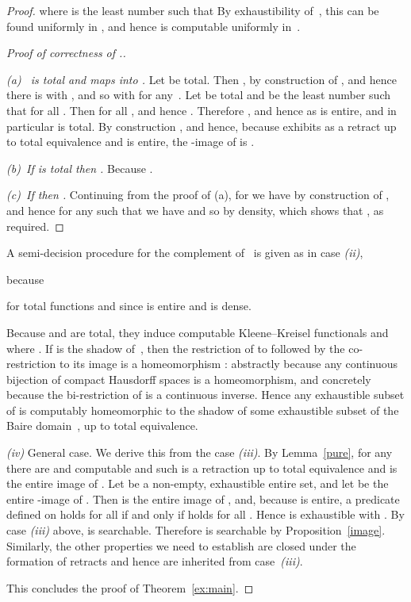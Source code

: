\documentclass{LMCS}
\begin{document}
\begin{proof}
where
 is the least number such that 
By exhaustibility of~, this can be found uniformly
  in , and hence  is computable uniformly in~.

\pagebreak[3]
\begin{proof}[Proof of correctness of .]
~

\emph{(a)~ is total and maps  into .} 
Let  be total.  Then , by
construction of , and hence there is  with , and so with  for any~. Let 
be total and  be the least number such that  for all
. Then  for all , and hence .  Therefore , and hence  as  is entire, and in
particular  is total.  By construction , and
hence, because  exhibits  as a retract up to total equivalence
and  is entire, the -image of  is .

\medskip
\emph{(b)~If  is total then .} 
Because .

\medskip
\emph{(c)~If  then .} 
Continuing from the proof of (a), for  we have  by construction of , and hence for any  such
that  we have  and so  by density, which shows
that , as required.
\end{proof}

\medskip

A semi-decision procedure for the complement of~ is
given as in case \emph{(ii)},

because 

for total functions  and  since  is entire and  is dense.

Because  and  are total, they induce computable Kleene--Kreisel
functionals  and  where . If  is the shadow of~, then the restriction of  to 
followed by the co-restriction to its image is a homeomorphism : abstractly because any continuous bijection of compact
Hausdorff spaces is a homeomorphism, and concretely because the
bi-restriction of  is a continuous inverse.  Hence any
exhaustible subset of  is computably homeomorphic to the
shadow of some exhaustible subset of the Baire domain~,
up to total equivalence.

\medskip

\pagebreak[3] \emph{(iv)} General case. We derive this from the case
\emph{(iii)}. By Lemma~\ref{pure}, for any  there are
 and computable  and  such  is a retraction up to total
equivalence and  is the entire image of .  Let  be a non-empty, exhaustible entire set, and let  be
the entire -image of . Then  is the entire image of ,
and, because  is entire, a predicate 
defined on  holds for all  if and only if 
holds for all .  Hence  is exhaustible with
. By case \emph{(iii)} above,
 is searchable. Therefore  is searchable by
Proposition~\ref{image}. Similarly, the other properties we need to
establish are closed under the formation of retracts and hence are
inherited from case~\emph{(iii)}.  

\medskip This concludes the proof of Theorem~\ref{ex:main}.
\end{proof}
\end{document}
